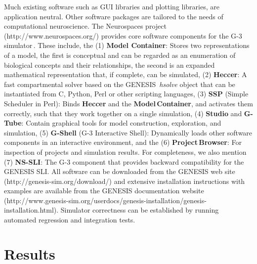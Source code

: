 \documentclass[10pt]{article}
\begin{document}
Much existing software such as GUI libraries and plotting libraries,
are application neutral.  Other software packages are tailored to the
needs of computational neuroscience.  The Neurospaces project
(http://www.neurospaces.org/) provides core software components for the
G-3 simulator\,\cite{cornelis03:_neuros}. These include, the (1) {\bf
  Model Container}: Stores two representations of a model, the first
is conceptual and can be regarded as an enumeration of biological
concepts and their relationships, the second is an expanded
mathematical representation that, if complete, can be simulated, (2)
{\bf Heccer}: A fast compartmental solver based on the GENESIS\,{\it
  hsolve} object that can be instantiated from C, Python, Perl or
other scripting languages, (3) {\bf SSP} (Simple Scheduler in Perl):
Binds {\bf Heccer} and the {\bf Model\,Container}, and activates them
correctly, such that they work together on a single simulation, (4)
{\bf Studio} and {\bf G-Tube}: Contain graphical tools for model
construction, exploration, and simulation, (5) {\bf G-Shell} (G-3
Interactive Shell): Dynamically loads other software components in an
interactive environment, and the (6) {\bf Project\,Browser}: For
inspection of projects and simulation results. For completeness, we
also mention (7) {\bf NS-SLI}: The G-3 component that provides
backward compatibility for the GENESIS SLI. All software can be
downloaded from the GENESIS web site
(http://genesis-sim.org/download/) and extensive installation
instructions with examples are available from the GENESIS
documentation website
(http://www.genesis-sim.org/userdocs/genesis-installation/genesis-installation.html).
Simulator correctness can be established by running automated
regression and integration tests.



\section*{Results}
\end{document}
